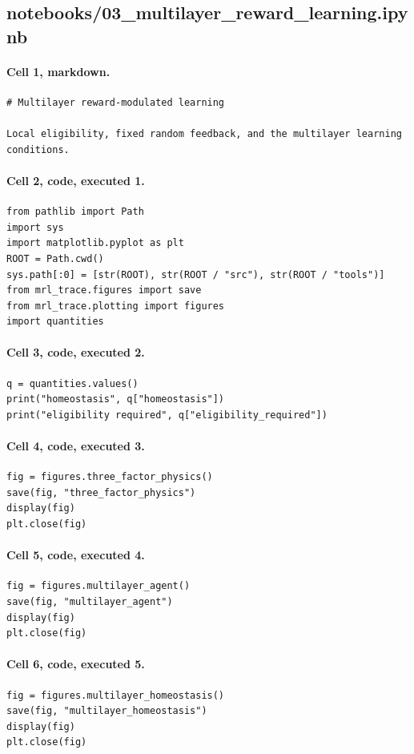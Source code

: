 \documentclass[a4paper,10pt]{article}
\begin{document}
\subsection{notebooks/03\_multilayer\_reward\_learning.ipynb}
\paragraph{Cell 1, markdown.}
\begin{Verbatim}
# Multilayer reward-modulated learning

Local eligibility, fixed random feedback, and the multilayer learning conditions.
\end{Verbatim}
\paragraph{Cell 2, code, executed 1.}
\begin{Verbatim}
from pathlib import Path
import sys
import matplotlib.pyplot as plt
ROOT = Path.cwd()
sys.path[:0] = [str(ROOT), str(ROOT / "src"), str(ROOT / "tools")]
from mrl_trace.figures import save
from mrl_trace.plotting import figures
import quantities
\end{Verbatim}
\paragraph{Cell 3, code, executed 2.}
\begin{Verbatim}
q = quantities.values()
print("homeostasis", q["homeostasis"])
print("eligibility required", q["eligibility_required"])
\end{Verbatim}
\paragraph{Cell 4, code, executed 3.}
\begin{Verbatim}
fig = figures.three_factor_physics()
save(fig, "three_factor_physics")
display(fig)
plt.close(fig)
\end{Verbatim}
\paragraph{Cell 5, code, executed 4.}
\begin{Verbatim}
fig = figures.multilayer_agent()
save(fig, "multilayer_agent")
display(fig)
plt.close(fig)
\end{Verbatim}
\paragraph{Cell 6, code, executed 5.}
\begin{Verbatim}
fig = figures.multilayer_homeostasis()
save(fig, "multilayer_homeostasis")
display(fig)
plt.close(fig)
\end{Verbatim}
\end{document}

